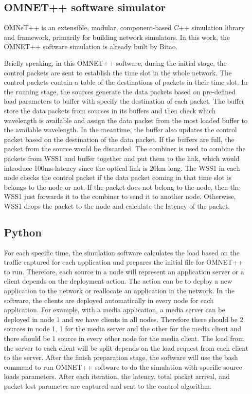 \documentclass[conference]{IEEEtran}
\begin{document}

\subsection{OMNET++ software simulator}
OMNeT++ is an extensible, modular, component-based C++ simulation library and framework, primarily for building network simulators. In this work, the OMNET++ software simulation is already built by Bitao. 

Briefly speaking, in this OMNET++ software, during the initial stage, the control packets are sent to establish the time slot in the whole network. The control packets contain a table of the destinations of packets in their time slot. In the running stage, the sources generate the data packets based on pre-defined load parameters to buffer with specify the destination of each packet. The buffer store the data packets from sources in its buffers and then check which wavelength is available and assign the data packet from the most loaded buffer to the available wavelength. In the meantime, the buffer also updates the control packet based on the destination of the data packet. If the buffers are full, the packet from the source would be discarded. The combiner is used to combine the packets from WSS1 and buffer together and put them to the link, which would introduce 100ms latency since the optical link is 20km long. The WSS1 in each node checks the control packet if the data packet coming in that time slot is belongs to the node or not. If the packet does not belong to the node, then the WSS1 just forwards it to the combiner to send it to another node. Otherwise, WSS1 drops the packet to the node and calculate the latency of the packet.

\subsection{Python}

For each specific time, the simulation software calculates the load based on the traffic captured for each application and prepares the initial file for OMNET++ to run. Therefore, each source in a node will represent an application server or a client depends on the deployment action. The action can be to deploy a new application to the network or reallocate an application in the network. In the software, the clients are deployed automatically in every node for each application. For example, with a media application, a media server can be deployed in node 1 and we have clients in all nodes. Therefore there should be 2 sources in node 1, 1 for the media server and the other for the media client and there should be 1 source in every other node for the media client. The load from the server to each client will be split depends on the load request from each client to the server. After the finish preparation stage, the software will use the bash command to run OMNET++ software to do the simulation with specific source loads parameters. After each iteration, the latency, total packet arrival, and packet lost parameter are captured and sent to the control algorithm.
\end{document}
